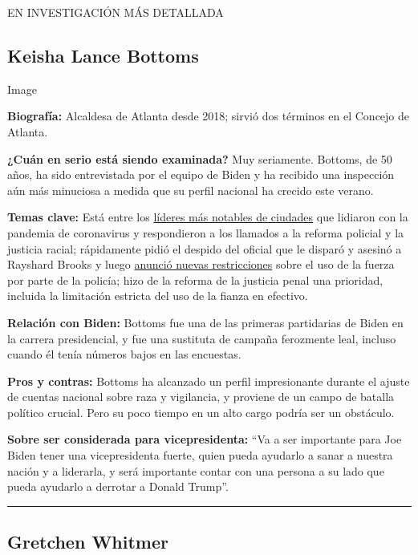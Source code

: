 EN INVESTIGACIÓN MÁS DETALLADA

\hypertarget{keisha-lance-bottoms}{%
\subsection{Keisha Lance Bottoms}\label{keisha-lance-bottoms}}

Image

\textbf{Biografía:} Alcaldesa de Atlanta desde 2018; sirvió dos términos
en el Concejo de Atlanta.

\textbf{¿Cuán en serio está siendo examinada?} Muy seriamente. Bottoms,
de 50 años, ha sido entrevistada por el equipo de Biden y ha recibido
una inspección aún más minuciosa a medida que su perfil nacional ha
crecido este verano.

\textbf{Temas clave:} Está entre los
\href{https://www.nytimes.com/2020/06/03/opinion/police-protests-atlanta-keisha-bottoms.html}{líderes
más notables de ciudades} que lidiaron con la pandemia de coronavirus y
respondieron a los llamados a la reforma policial y la justicia racial;
rápidamente pidió el despido del oficial que le disparó y asesinó a
Rayshard Brooks y luego
\href{https://www.nytimes.com/2020/06/15/us/rayshard-brooks-keisha-bottoms-atlanta.html}{anunció
nuevas restricciones} sobre el uso de la fuerza por parte de la policía;
hizo de la reforma de la justicia penal una prioridad, incluida la
limitación estricta del uso de la fianza en efectivo.

\textbf{Relación con Biden:} Bottoms fue una de las primeras partidarias
de Biden en la carrera presidencial, y fue una sustituta de campaña
ferozmente leal, incluso cuando él tenía números bajos en las encuestas.

\textbf{Pros y contras:} Bottoms ha alcanzado un perfil impresionante
durante el ajuste de cuentas nacional sobre raza y vigilancia, y
proviene de un campo de batalla político crucial. Pero su poco tiempo en
un alto cargo podría ser un obstáculo.

\textbf{Sobre ser considerada para vicepresidenta:} ``Va a ser
importante para Joe Biden tener una vicepresidenta fuerte, quien pueda
ayudarlo a sanar a nuestra nación y a liderarla, y será importante
contar con una persona a su lado que pueda ayudarlo a derrotar a Donald
Trump''.

\begin{center}\rule{0.5\linewidth}{\linethickness}\end{center}

\hypertarget{gretchen-whitmer}{%
\subsection{Gretchen Whitmer}\label{gretchen-whitmer}}

